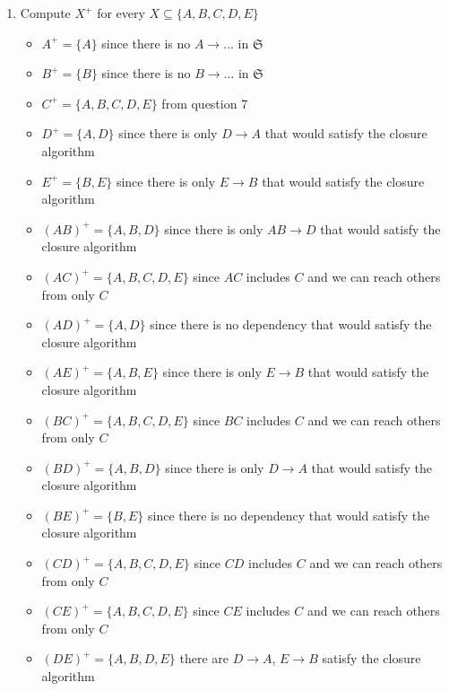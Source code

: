 \documentclass[12pt]{article}
\begin{document}
\begin{enumerate}
  \item Compute $X^+$ for every $X \subseteq \{A, B, C, D, E\}$
        \begin{itemize}
          \item $A^+ = \{A\}$ since there is no $A \longrightarrow \dots$ in
                $\mathfrak{S}$
          \item $B^+ = \{B\}$ since there is no $B \longrightarrow \dots$ in
                $\mathfrak{S}$
          \item $C^+ = \{A, B, C, D, E\}$ from question 7
          \item $D^+ = \{A, D\}$ since there is only $D \longrightarrow A$ that
                would satisfy the closure algorithm
          \item $E^+ = \{B, E\}$ since there is only $E \longrightarrow B$ that
                would satisfy the closure algorithm
          \item $(AB)^+ = \{A, B, D\}$ since there is only $AB \longrightarrow
                D$ that would satisfy the closure algorithm
          \item $(AC)^+ = \{A, B, C, D, E\}$ since $AC$ includes $C$ and we can
                reach others from only $C$
          \item $(AD)^+ = \{A, D\}$ since there is no dependency that would
                satisfy the closure algorithm
          \item $(AE)^+ = \{A, B, E\}$ since there is only $E \longrightarrow B$
                that would satisfy the closure algorithm
          \item $(BC)^+ = \{A, B, C, D, E\}$ since $BC$ includes $C$ and we can
                reach others from only $C$
          \item $(BD)^+ = \{A, B, D\}$ since there is only $D \longrightarrow A$
                that would satisfy the closure algorithm
          \item $(BE)^+ = \{B, E\}$ since there is no dependency that would
                satisfy the closure algorithm
          \item $(CD)^+ = \{A, B, C, D, E\}$ since $CD$ includes $C$ and we can
                reach others from only $C$
          \item $(CE)^+ = \{A, B, C, D, E\}$ since $CE$ includes $C$ and we can
                reach others from only $C$
          \item $(DE)^+ = \{A, B, D, E\}$ there are $D \longrightarrow A$, $E
                \longrightarrow B$ satisfy the closure algorithm

\end{itemize}
\end{enumerate}
\end{document}
